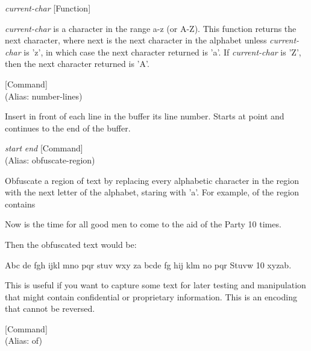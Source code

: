 \vspace{1em}
\noindent
{}
\usebox{\funcname}\emph{current-char}
 \hfill [Function]

\begin{doc-string}
\emph{current-char} is a character in the range a-z (or A-Z).  This function returns
the next character, where next is the next character in the alphabet unless
\emph{current-char} is 'z', in which case the next character returned is 'a'.  If
\emph{current-char} is 'Z', then the next character returned is 'A'.
\end{doc-string}

\vspace{1em}
\noindent
{}
\usebox{\funcname}
 \hfill [Command]\\%
 (Alias: number-lines)

\begin{doc-string}
Insert in front of each line in the buffer its line number.  Starts
at point and continues to the end of the buffer.
\end{doc-string}

\vspace{1em}
\noindent
{}
\usebox{\funcname}\emph{start} \emph{end}
 \hfill [Command]\\%
 (Alias: obfuscate-region)

\begin{doc-string}
Obfuscate a region of text by replacing every alphabetic character in the
region with the next letter of the alphabet, staring with 'a'. For example, of
the region contains

  Now is the time for all good men to come to the aid of the Party 10 times.

Then the obfuscated text would be:

  Abc de fgh ijkl mno pqr stuv wxy za bcde fg hij klm no pqr Stuvw 10 xyzab.

This is useful if you want to capture some text for later testing and
manipulation that might contain confidential or proprietary information.  This
is an encoding that cannot be reversed.
\end{doc-string}

\vspace{1em}
\noindent
{}
\usebox{\funcname}
 \hfill [Command]\\%
 (Alias: of)

